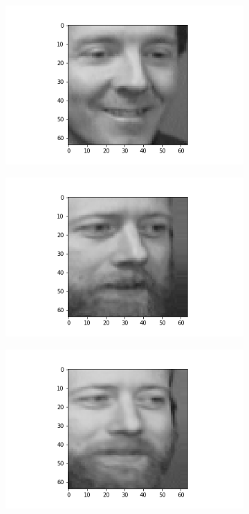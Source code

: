 \documentclass[12pt, a4paper]{article}
\begin{document}
\begin{figure}[h]
\begin{subfigure}{0.3\linewidth}
    \end{subfigure}
    \newline
    \begin{subfigure}{0.3\linewidth}
        \centering
        \includegraphics[width=\linewidth]{images/q3/c/7/3.png}
    \end{subfigure}
    \hfill
    \begin{subfigure}{0.3\linewidth}
        \centering
        \includegraphics[width=\linewidth]{images/q3/c/7/4.png}
    \end{subfigure}
    \hfill
    \begin{subfigure}{0.3\linewidth}
        \centering
        \includegraphics[width=\linewidth]{images/q3/c/7/5.png}

\end{subfigure}
\end{figure}
\end{document}

